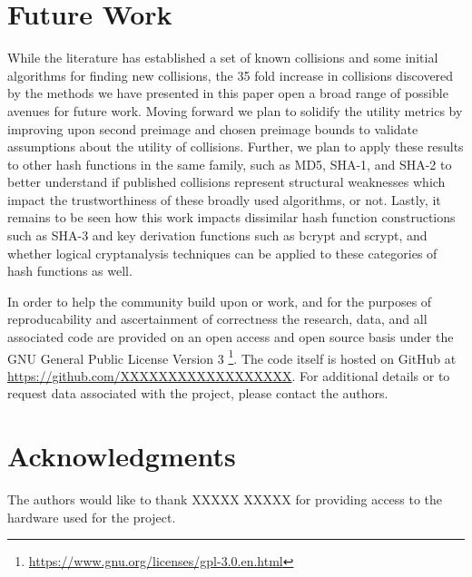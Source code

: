 \documentclass[conference]{IEEEtran}
\begin{document}
\section{Future Work} \label{Sec:Future}

While the literature has established a set of known collisions and
some initial algorithms for finding new collisions, the 35 fold
increase in collisions discovered by the methods we have presented in
this paper open a broad range of possible avenues for future work.
Moving forward we plan to solidify the utility metrics by improving upon
second preimage and chosen preimage bounds to validate assumptions about the
utility of collisions. Further, we plan to apply these results to other hash
functions in the same family, such as MD5, SHA-1, and SHA-2 to better
understand if published collisions represent structural weaknesses
which impact the trustworthiness of these broadly used algorithms, or not. Lastly, it
remains to be seen how this work impacts dissimilar hash function constructions such as
SHA-3 and key derivation functions such as bcrypt and scrypt, and whether
logical cryptanalysis techniques can be applied to these categories of
hash functions as well.

In order to help the community build upon or work, and for the
purposes of reproducability and ascertainment of correctness the
research, data, and all associated code are provided on an open access
and open source basis under the GNU General Public License Version 3
\footnote{\url{https://www.gnu.org/licenses/gpl-3.0.en.html}}.
The code itself is hosted on GitHub at \url{https://github.com/XXXXXXXXXXXXXXXXXX}.
For additional details or to request data associated with the project, please
contact the authors.



\section*{Acknowledgments}

The authors would like to thank XXXXX XXXXX for providing access to
the hardware used for the
project.














\end{document}
